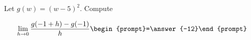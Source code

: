 \documentclass{ximera}
\author{Bart Snapp}
\begin{document}
\begin{exercise}
Let $g(w) = (w-5)^2$. Compute

\[
\lim_{ h\to 0 } \frac{g(-1+h)-g(-1)}{h} \begin{prompt}=\answer{-12}\end{prompt}
\]
\end{exercise}
\end{document}
